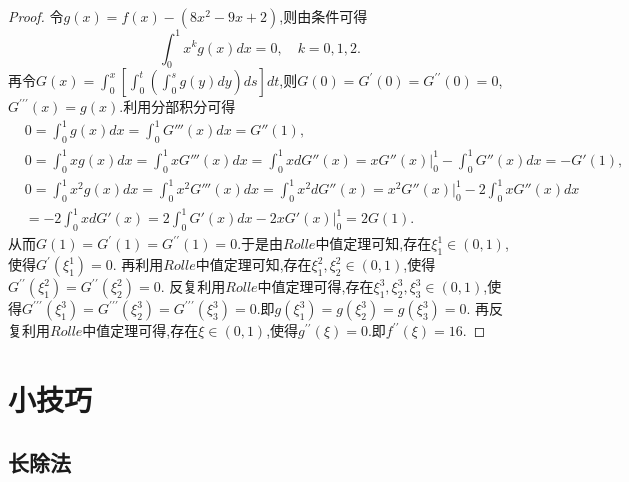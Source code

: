 \documentclass[lang=cn,newtx,10pt,scheme=chinese]{elegantbook}
\begin{document}
\begin{proof}
令\(g(x)=f(x)-(8x^2 - 9x + 2)\),则由条件可得
\[
\int_0^1 x^k g(x)dx = 0, \quad k = 0,1,2.
\]
再令\(G(x)=\int_0^x\left[\int_0^t\left(\int_0^s g(y)dy\right)ds\right]dt\),则\(G(0)=G^\prime(0)=G^{\prime\prime}(0)=0\),\(G^{\prime\prime\prime}(x)=g(x)\).利用分部积分可得
\begin{align*}
&0=\int_0^1{g\left( x \right) dx}=\int_0^1{G'''\left( x \right) dx}=G''\left( 1 \right) ,
\\
&0=\int_0^1{xg\left( x \right) dx}=\int_0^1{xG'''\left( x \right) dx}=\int_0^1{xdG''\left( x \right)}=xG''\left( x \right) \Big |_{0}^{1}-\int_0^1{G''\left( x \right) dx}=-G'\left( 1 \right) ,
\\
&0=\int_0^1{x^2g\left( x \right) dx}=\int_0^1{x^2G'''\left( x \right) dx}=\int_0^1{x^2dG''\left( x \right)}=x^2G''\left( x \right) \Big |_{0}^{1}-2\int_0^1{xG''\left( x \right) dx}
\\
&=-2\int_0^1{xdG'\left( x \right)}=2\int_0^1{G'\left( x \right) dx}-2xG'\left( x \right) \Big |_{0}^{1}=2G\left( 1 \right) .
\end{align*}
从而\(G(1)=G^\prime(1)=G^{\prime\prime}(1)=0\).于是由\(Rolle\)中值定理可知,存在\(\xi_1^1\in(0,1)\),使得\(G^\prime(\xi_1^1)=0\).
再利用\(Rolle\)中值定理可知,存在\(\xi_1^2,\xi_2^2\in(0,1)\),使得\(G^{\prime\prime}(\xi_1^2)=G^{\prime\prime}(\xi_2^2)=0\).
反复利用\(Rolle\)中值定理可得,存在\(\xi_1^3,\xi_2^3,\xi_3^3\in(0,1)\),使得\(G^{\prime\prime\prime}(\xi_1^3)=G^{\prime\prime\prime}(\xi_2^3)=G^{\prime\prime\prime}(\xi_3^3)=0\).即\(g(\xi_1^3)=g(\xi_2^3)=g(\xi_3^3)=0\).
再反复利用\(Rolle\)中值定理可得,存在\(\xi\in(0,1)\),使得\(g^{\prime\prime}(\xi)=0\).即\(f^{\prime\prime}(\xi)=16\).
\end{proof}

















\chapter{小技巧}

\section{长除法}
\end{document}
